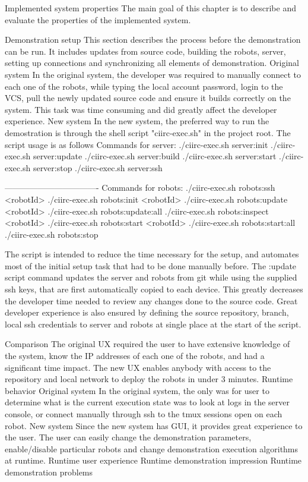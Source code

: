 \chap Implemented system properties
The main goal of this chapter is to describe and evaluate the properties of the implemented system.

\sec Demonstration setup
This section describes the process before the demonstration can be run. It includes updates from source code, building the robots, server, setting up connections and synchronizing all elements of demonstration.
\secc Original system
In the original system, the developer was required to manually connect to each one of the robots, while typing the local account password, login to the VCS, pull the newly updated source code and ensure it builds correctly on the system. This task was time consuming and did greatly affect the developer experience.
\secc New system
In the new system, the preferred way to run the demostration is through the shell script "ciirc-exec.sh" in the project root. The script usage is as follows
\begtt
Commands for server:
./ciirc-exec.sh server:init
./ciirc-exec.sh server:update
./ciirc-exec.sh server:build
./ciirc-exec.sh server:start
./ciirc-exec.sh server:stop
./ciirc-exec.sh server:ssh

----------------------------------
Commands for robots:
./ciirc-exec.sh robots:ssh <robotId>
./ciirc-exec.sh robots:init <robotId>
./ciirc-exec.sh robots:update <robotId>
./ciirc-exec.sh robots:update:all
./ciirc-exec.sh robots:inspect <robotId>
./ciirc-exec.sh robots:start <robotId>
./ciirc-exec.sh robots:start:all
./ciirc-exec.sh robots:stop
\endtt

The script is intended to reduce the time necessary for the setup, and automates most of the initial setup task that had to be done manually before. The :update script command updates the server and robots from git while using the supplied ssh keys, that are first automatically copied to each device. This greatly decreases the developer time needed to review any changes done to the source code. Great developer experience is also ensured by defining the source repository, branch, local ssh credentials to server and robots at single place at the start of the script.

\secc Comparison
The original UX required the user to have extensive knowledge of the system, know the IP addresses of each one of the robots, and had a significant time impact. The new UX enables anybody with access to the repository and local network to deploy the robots in under 3 minutes.
\sec Runtime behavior
\secc Original system
In the original system, the only was for user to determine what is the current execution state was to look at logs in the server console, or connect manually through ssh to the tmux sessions open on each robot.
\secc New system
Since the new system has GUI, it provides great experience to the user. The user can easily change the demonstration parameters, enable/disable particular robots and change demonstration execution algorithms at runtime.
\sec Runtime user experience
\sec Runtime demonstration impression
\sec Runtime demonstration problems